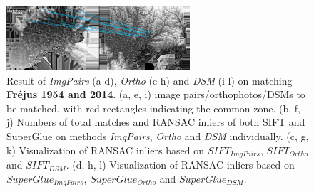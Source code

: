 \begin{figure}[htbp]
\begin{center}
{            \begin{minipage}[t]{0.48\linewidth}
                \centering
                \includegraphics[width=6.8cm]{images/Chapitre3/Homol-SIFT2Step-Rough-2DRANSAC_MEC-Malt_Tapas_1954_MEC-Malt_2014.png}
            \end{minipage}%
        }
        \caption{{\scriptsize Result of \textit{ImgPairs} (a-d), \textit{Ortho} (e-h) and \textit{DSM} (i-l) on matching \textbf{Fr{\'e}jus 1954 and 2014}. (a, e, i) image pairs/orthophotos/DSMs to be matched, with red rectangles indicating the common zone. (b, f, j) Numbers of total matches and RANSAC inliers of both SIFT and SuperGlue on methods \textit{ImgPairs}, \textit{Ortho} and \textit{DSM} individually. (c, g, k) Visualization of RANSAC inliers based on $SIFT_{ImgPairs}$, $SIFT_{Ortho}$ and $SIFT_{DSM}$. (d, h, l) Visualization of RANSAC inliers based on $SuperGlue_{ImgPairs}$, $SuperGlue_{Ortho}$ and $SuperGlue_{DSM}$.}}
        \label{MatchVizFrejus1954DSM}
    \end{center}
\end{figure} 



